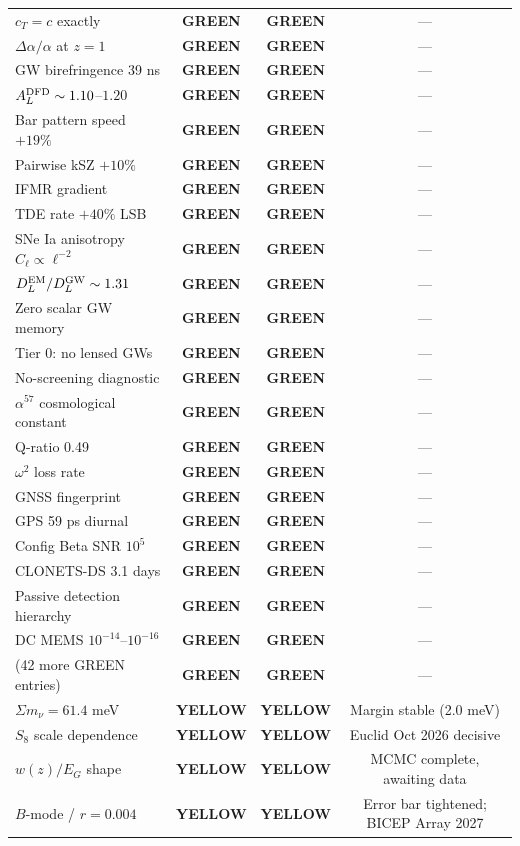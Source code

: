 \documentclass[11pt,a4paper]{article}
\newcommand{\GREEN}{\textcolor{dfdgreen}{\textbf{GREEN}}}
\newcommand{\YELLOW}{\textcolor{dfdyellow}{\textbf{YELLOW}}}
\begin{document}
\begin{center}
\begin{longtable}{p{5cm}ccc}
$c_T = c$ exactly & \GREEN & \GREEN & --- \\
$\Delta\alpha/\alpha$ at $z = 1$ & \GREEN & \GREEN & --- \\
GW birefringence 39 ns & \GREEN & \GREEN & --- \\
$A_L^{\rm DFD} \sim 1.10$--$1.20$ & \GREEN & \GREEN & --- \\
Bar pattern speed $+19\%$ & \GREEN & \GREEN & --- \\
Pairwise kSZ $+10\%$ & \GREEN & \GREEN & --- \\
IFMR gradient & \GREEN & \GREEN & --- \\
TDE rate $+40\%$ LSB & \GREEN & \GREEN & --- \\
SNe Ia anisotropy $C_\ell \propto \ell^{-2}$ & \GREEN & \GREEN & --- \\
$D_L^{\rm EM}/D_L^{\rm GW} \sim 1.31$ & \GREEN & \GREEN & --- \\
Zero scalar GW memory & \GREEN & \GREEN & --- \\
Tier 0: no lensed GWs & \GREEN & \GREEN & --- \\
No-screening diagnostic & \GREEN & \GREEN & --- \\
$\alpha^{57}$ cosmological constant & \GREEN & \GREEN & --- \\
Q-ratio 0.49 & \GREEN & \GREEN & --- \\
$\omega^2$ loss rate & \GREEN & \GREEN & --- \\
GNSS fingerprint & \GREEN & \GREEN & --- \\
GPS 59 ps diurnal & \GREEN & \GREEN & --- \\
Config Beta SNR $10^5$ & \GREEN & \GREEN & --- \\
CLONETS-DS 3.1 days & \GREEN & \GREEN & --- \\
Passive detection hierarchy & \GREEN & \GREEN & --- \\
DC MEMS $10^{-14}$--$10^{-16}$ & \GREEN & \GREEN & --- \\
(42 more GREEN entries) & \GREEN & \GREEN & --- \\
\midrule
$\Sigma m_\nu = 61.4$ meV & \YELLOW & \YELLOW & Margin stable (2.0 meV) \\
$S_8$ scale dependence & \YELLOW & \YELLOW & Euclid Oct 2026 decisive \\
$w(z)/E_G$ shape & \YELLOW & \YELLOW & MCMC complete, awaiting data \\
$B$-mode / $r = 0.004$ & \YELLOW & \YELLOW & Error bar tightened; BICEP Array 2027 \\
\bottomrule
\end{longtable}
\end{center}
\end{document}
